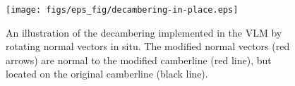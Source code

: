 \begin{figure}[h!t]
    \centering
    \texttt{[image: figs/eps\_fig/decambering-in-place.eps]}
    \caption{An illustration of the decambering implemented in the VLM by rotating normal vectors in situ. The modified normal vectors (red arrows) are normal to the modified camberline (red line), but located on the original camberline (black line).}
    \label{fig:decam-in-place}
\end{figure}